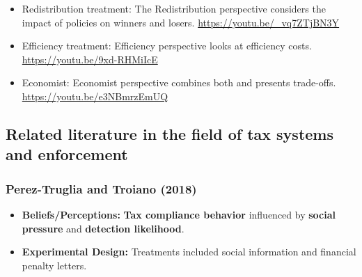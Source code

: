 \documentclass[a4paper, 12pt]{article}
\begin{document}
\begin{itemize}
\begin{itemize}
            \begin{itemize}
                \item Redistribution treatment: The Redistribution perspective considers the impact of policies on winners and losers. \url{https://youtu.be/_vq7ZTjBN3Y}
                \item Efficiency treatment: Efficiency perspective looks at  efficiency costs. \url{https://youtu.be/9xd-RHMiIcE}
                \item Economist: Economist perspective combines both and presents trade-offs. \url{https://youtu.be/e3NBmrzEmUQ}
            \end{itemize}
        \end{itemize}
        \end{itemize}

\subsection{Related literature in the field of tax systems and enforcement}
\subsubsection*{Perez-Truglia and Troiano (2018)}
\begin{itemize}
    \item \textbf{Beliefs/Perceptions:} \textbf{Tax compliance behavior} influenced by \textbf{social pressure} and \textbf{detection likelihood}.
    \item \textbf{Experimental Design:} Treatments included social information and financial penalty letters.
\end{itemize}

\printbibliography[heading=bibintoc]
\end{document}

